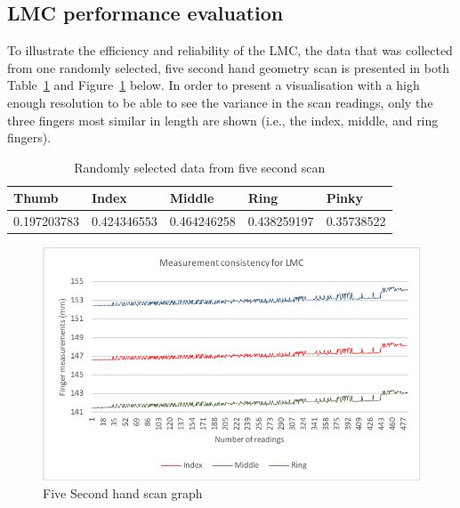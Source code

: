 \subsection{LMC performance evaluation}

To illustrate the efficiency and reliability of the LMC, the data that was collected from one randomly selected, five second hand geometry scan is presented in both Table~\ref{table: Randomly selected data from five second scan} and Figure~\ref{fig:Five Second hand scan graph} below. 
In order to present a visualisation with a high enough resolution to be able to see the variance in the scan readings, only the three fingers most similar in length are shown (i.e., the index, middle, and ring fingers). 

    
    \begin{table}[h!]
    \caption{Randomly selected data from five second scan}
    \centering
     \begin{tabular}{|p{} | p{}| p{}| p{}| p{}|} 
     \hline
    	\textbf{Thumb} & \textbf{Index} & \textbf{Middle} & \textbf{Ring} & \textbf{Pinky} \\ [1ex] 
     \hline\hline 
     0.197203783 & 0.424346553 &  0.464246258 & 0.438259197 & 0.35738522 \\[1ex]
     \hline 
     \end{tabular}
     \label{table: Randomly selected data from five second scan}
    \end{table}

    
    \begin{figure}[htbp!] 
    \centering    
    \includegraphics[width=1.0\textwidth]{Chapter4/Figs/Consistency.png}
    \caption[Five Second hand scan graph]{Five Second hand scan graph}
    \label{fig:Five Second hand scan graph}
    \end{figure}
    
